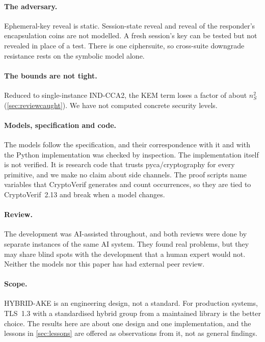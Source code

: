 \paragraph{The adversary.} Ephemeral-key reveal is static. Session-state
reveal and reveal of the responder's encapsulation coins are not modelled. A
fresh session's key can be tested but not revealed in place of a test. There
is one ciphersuite, so cross-suite downgrade resistance rests on the
symbolic model alone.

\paragraph{The bounds are not tight.} Reduced to single-instance IND-CCA2,
the KEM term loses a factor of about $n_S^2$ (\cref{sec:reviewcaught}). We
have not computed concrete security levels.

\paragraph{Models, specification and code.} The models follow the
specification, and their correspondence with it and with the Python
implementation was checked by inspection. The implementation itself is not
verified. It is research code that trusts pyca/cryptography for every
primitive, and we make no claim about side channels. The proof scripts name
variables that CryptoVerif generates and count occurrences, so they are tied
to CryptoVerif~2.13 and break when a model changes.

\paragraph{Review.} The development was AI-assisted throughout, and both
reviews were done by separate instances of the same AI system. They found
real problems, but they may share blind spots with the development that a
human expert would not. Neither the models nor this paper has had external
peer review.

\paragraph{Scope.} HYBRID-AKE is an engineering design, not a standard. For
production systems, TLS~1.3 with a standardised hybrid group from a
maintained library is the better choice. The results here are about one
design and one implementation, and the lessons in \cref{sec:lessons} are
offered as observations from it, not as general findings.
